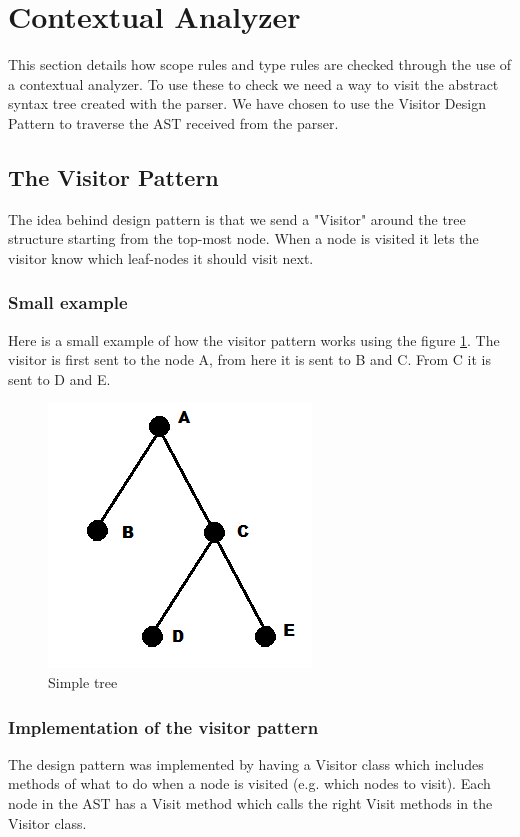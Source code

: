 \section{Contextual Analyzer}
	This section details how scope rules and type rules are checked through the use of a contextual analyzer.
	To use these to check we need a way to visit the abstract syntax tree created with the parser. We have chosen to use 
	the Visitor Design Pattern to traverse the AST received from the parser.
	
	\subsection{The Visitor Pattern}
		The idea behind design pattern is that we send a "Visitor" around the tree structure starting from the top-most node. When a node is 
		visited it lets the visitor know which leaf-nodes it should visit next. \\
		
		\subsubsection*{Small example}
			Here is a small example of how the visitor pattern works using the figure \ref{fig:simpletree}. 
			The visitor is first sent to the node A, from here it is sent to B and C. From C it is sent to D and E.
		
			\begin{figure}
				\centering
				\includegraphics{rapport/6/figures/simpletree}
				\caption{Simple tree} \label{fig:simpletree}
			\end{figure}
			
		\subsubsection{Implementation of the visitor pattern}
			The design pattern was implemented by having a Visitor class which includes methods of what to do when a node is visited 
			(e.g. which nodes to visit). Each node in the AST has a Visit method which calls the right Visit methods in the Visitor class. \\
	
